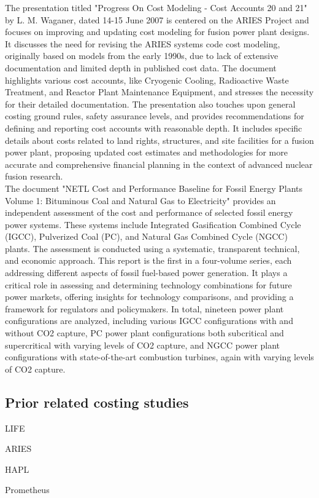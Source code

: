The presentation titled "Progress On Cost Modeling - Cost Accounts 20 and 21" by L. M. Waganer, dated 14-15 June 2007 \cite{Waganer2007} is centered on the ARIES Project and focuses on improving and updating cost modeling for fusion power plant designs. It discusses the need for revising the ARIES systems code cost modeling, originally based on models from the early 1990s, due to lack of extensive documentation and limited depth in published cost data. The document highlights various cost accounts, like Cryogenic Cooling, Radioactive Waste Treatment, and Reactor Plant Maintenance Equipment, and stresses the necessity for their detailed documentation. The presentation also touches upon general costing ground rules, safety assurance levels, and provides recommendations for defining and reporting cost accounts with reasonable depth. It includes specific details about costs related to land rights, structures, and site facilities for a fusion power plant, proposing updated cost estimates and methodologies for more accurate and comprehensive financial planning in the context of advanced nuclear fusion research.\\

The document "NETL Cost and Performance Baseline for Fossil Energy Plants Volume 1: Bituminous Coal and Natural Gas to Electricity" \cite{JamesCorrespondingAuthor2019} provides an independent assessment of the cost and performance of selected fossil energy power systems. These systems include Integrated Gasification Combined Cycle (IGCC), Pulverized Coal (PC), and Natural Gas Combined Cycle (NGCC) plants. The assessment is conducted using a systematic, transparent technical, and economic approach. This report is the first in a four-volume series, each addressing different aspects of fossil fuel-based power generation. It plays a critical role in assessing and determining technology combinations for future power markets, offering insights for technology comparisons, and providing a framework for regulators and policymakers. In total, nineteen power plant configurations are analyzed, including various IGCC configurations with and without CO2 capture, PC power plant configurations both subcritical and supercritical with varying levels of CO2 capture, and NGCC power plant configurations with state-of-the-art combustion turbines, again with varying levels of CO2 capture.

\subsection{Prior related costing studies}

LIFE 

ARIES 

HAPL

Prometheus

